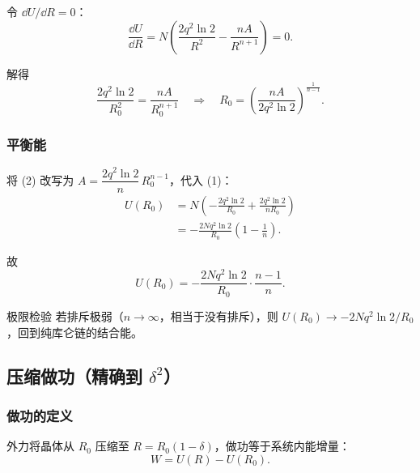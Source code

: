 令 $\dd U/\dd R = 0$：
\[
  \frac{\dd U}{\dd R} = N\left(\frac{2q^2\ln 2}{R^2} - \frac{nA}{R^{n+1}}\right) = 0.
\]

解得
\[
  \frac{2q^2\ln 2}{R_0^2} = \frac{nA}{R_0^{n+1}}
  \quad\Longrightarrow\quad
  \boxed{ R_0 = \left(\frac{nA}{2q^2\ln 2}\right)^{\!\frac{1}{n-1}} }. \tag{2}
\]

\subsubsection{平衡能}

将 (2) 改写为 $A = \dfrac{2q^2\ln 2}{n}\,R_0^{n-1}$，代入 (1)：
\begin{align*}
  U(R_0) &= N\left(-\frac{2q^2\ln 2}{R_0} + \frac{2q^2\ln 2}{nR_0}\right) \\
         &= -\frac{2Nq^2\ln 2}{R_0}\left(1 - \frac{1}{n}\right).
\end{align*}

故
\[
  \boxed{ U(R_0) = -\frac{2Nq^2\ln 2}{R_0}\cdot\frac{n-1}{n} }. \tag{3}
\]

\begin{tipbox}{极限检验}
若排斥极弱（$n\to\infty$，相当于没有排斥），则 $U(R_0)\to -2Nq^2\ln 2/R_0$，回到纯库仑链的结合能。
\end{tipbox}

\subsection{压缩做功（精确到 $\delta^2$）}

\subsubsection{做功的定义}

外力将晶体从 $R_0$ 压缩至 $R = R_0(1-\delta)$，做功等于系统内能增量：
\[
  W = U(R) - U(R_0).
\]

